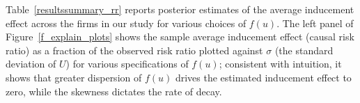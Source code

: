 \documentclass[aoas,preprint, 11pt, dvipsnames, table, x11name]{imsart}
\theoremstyle{remark}
\begin{document}
	Table~\ref{resultssummary_rr} reports posterior estimates of the average inducement effect across the firms in our study for various choices of $f(u)$. The left panel of Figure~\ref{f_explain_plots} shows the sample average inducement effect (causal risk ratio) as a fraction of the observed risk ratio plotted against $\sigma$ (the standard deviation of $U$) for various  specifications of $f(u)$; consistent with intuition, it shows that greater dispersion of $f(u)$ drives the estimated inducement effect to zero, while the skewness dictates the rate of decay.
\end{document}
